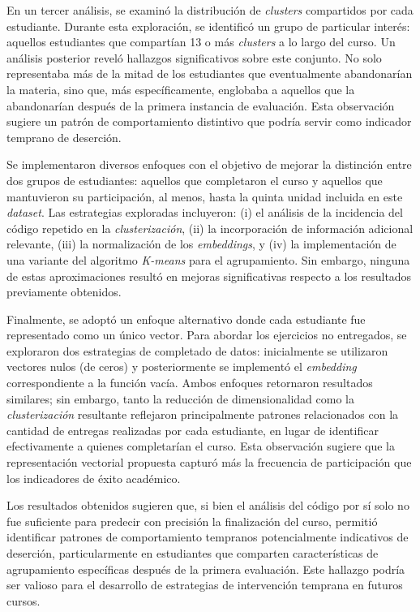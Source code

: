\documentclass[11pt,a4paper,twoside,openany]{tesis}
\begin{document}
En un tercer análisis, se examinó la distribución de \emph{clusters} compartidos por cada estudiante. Durante esta exploración, se identificó un grupo de particular interés: aquellos estudiantes que compartían 13 o más \emph{clusters} a lo largo del curso. Un análisis posterior reveló hallazgos significativos sobre este conjunto. No solo representaba más de la mitad de los estudiantes que eventualmente abandonarían la materia, sino que, más específicamente, englobaba a aquellos que la abandonarían después de la primera instancia de evaluación. Esta observación sugiere un patrón de comportamiento distintivo que podría servir como indicador temprano de deserción.

Se implementaron diversos enfoques con el objetivo de mejorar la distinción entre dos grupos de estudiantes: aquellos que completaron el curso y aquellos que mantuvieron su participación, al menos, hasta la quinta unidad incluida en este \emph{dataset}. Las estrategias exploradas incluyeron: (i) el análisis de la incidencia del código repetido en la \emph{clusterización}, (ii) la incorporación de información adicional relevante, (iii) la normalización de los \emph{embeddings}, y (iv) la implementación de una variante del algoritmo \emph{K-means} para el agrupamiento. Sin embargo, ninguna de estas aproximaciones resultó en mejoras significativas respecto a los resultados previamente obtenidos.

Finalmente, se adoptó un enfoque alternativo donde cada estudiante fue representado como un único vector. Para abordar los ejercicios no entregados, se exploraron dos estrategias de completado de datos: inicialmente se utilizaron vectores nulos (de ceros) y posteriormente se implementó el \emph{embedding} correspondiente a la función vacía. Ambos enfoques retornaron resultados similares; sin embargo, tanto la reducción de dimensionalidad como la \emph{clusterización} resultante reflejaron principalmente patrones relacionados con la cantidad de entregas realizadas por cada estudiante, en lugar de identificar efectivamente a quienes completarían el curso. Esta observación sugiere que la representación vectorial propuesta capturó más la frecuencia de participación que los indicadores de éxito académico.

Los resultados obtenidos sugieren que, si bien el análisis del código por sí solo no fue suficiente para predecir con precisión la finalización del curso, permitió identificar patrones de comportamiento tempranos potencialmente indicativos de deserción, particularmente en estudiantes que comparten características de agrupamiento específicas después de la primera evaluación. Este hallazgo podría ser valioso para el desarrollo de estrategias de intervención temprana en futuros cursos.
\end{document}
